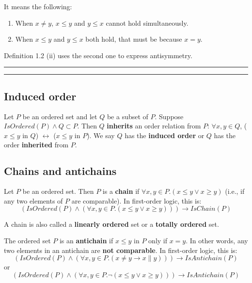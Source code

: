 \documentclass[12pt, letterpaper, oneside]{book}
\begin{document}
It means the following:
\begin{enumerate}
  \item When $x \ne y$, $x \leqslant y$ and $y \leqslant x$ cannot hold simultaneously.
  \item When $x \leqslant y$ and $y \leqslant x$ both hold, that must be because $x = y$.
\end{enumerate}

Definition 1.2 (ii) uses the second one to express antisymmetry.

\noindent\rule{10cm}{0.4pt}\rule{1cm}{10pt}

\subsection{Induced order}

Let $P$ be an ordered set and let $Q$ be a subset of $P$.
Suppose $IsOrdered(P) \land Q \subset P$. Then $Q$ \textbf{inherits} an order relation from $P$: $\forall x, y \in Q$,
($x \leqslant y$ in $Q$) $\leftrightarrow$ ($x \leqslant y$ in $P$). We say $Q$ has the \textbf{induced order} or $Q$
has the order \textbf{inherited} from $P$.

\subsection{Chains and antichains} \label{ch01-chains-and-antichains}

Let $P$ be an ordered set. Then $P$ is a \textbf{chain} if $\forall x, y \in P. (x \leqslant y \lor x \geqslant y)$
(i.e., if any two elements of $P$ are comparable). In first-order logic, this is:
\[ (IsOrdered(P) \land (\forall x, y \in P. (x \leqslant y \lor x \geqslant y))) \rightarrow IsChain(P) \]

A chain is also called a \textbf{linearly ordered} set or a \textbf{totally ordered} set.

The ordered set $P$ is an \textbf{antichain} if $x \leqslant y$ in $P$ only if $x = y$. In other words, any two elements
in an antichain are \textbf{not comparable}. In first-order logic, this is:
\[ (IsOrdered(P) \land (\forall x, y \in P. (x \ne y \rightarrow x \parallel y))) \rightarrow IsAntichain(P) \]
or
\[ (IsOrdered(P) \land (\forall x, y \in P. \lnot(x \leqslant y \lor x \geqslant y))) \rightarrow IsAntichain(P) \]
\end{document}
